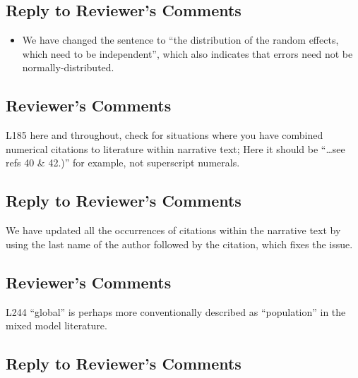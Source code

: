\documentclass[
]{article}
\providecommand{\tightlist}{%
  \setlength{\itemsep}{0pt}\setlength{\parskip}{0pt}}
\begin{document}
\hypertarget{section-20}{%
\subsection{\texorpdfstring{\textcolor{reviewersblue} {Reply to Reviewer's Comments}}{}}\label{section-20}}

\begin{itemize}
\tightlist
\item
  We have changed the sentence to ``the distribution of the random effects, which need to be independent'', which also indicates that errors need not be normally-distributed.
\end{itemize}

\hypertarget{reviewers-comments-20}{%
\subsection{Reviewer's Comments}\label{reviewers-comments-20}}

L185 here and throughout, check for situations where you have combined numerical citations to literature within narrative text; Here it should be ``\ldots see refs 40 \& 42.)'' for example, not superscript numerals.

\hypertarget{section-21}{%
\subsection{\texorpdfstring{\textcolor{reviewersblue} {Reply to Reviewer's Comments}}{}}\label{section-21}}

We have updated all the occurrences of citations within the narrative text by using the last name of the author followed by the citation, which fixes the issue.

\hypertarget{reviewers-comments-21}{%
\subsection{Reviewer's Comments}\label{reviewers-comments-21}}

L244 ``global'' is perhaps more conventionally described as ``population'' in the mixed model literature.

\hypertarget{section-22}{%
\subsection{\texorpdfstring{\textcolor{reviewersblue} {Reply to Reviewer's Comments}}{}}\label{section-22}}
\end{document}
